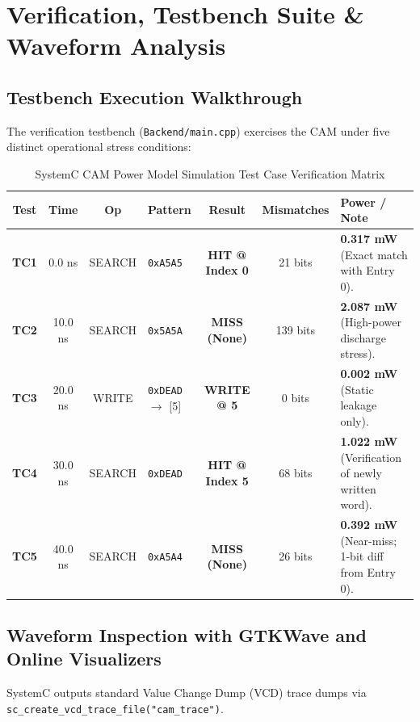 \documentclass[11pt,a4paper,oneside]{report}
\begin{document}
\chapter[Verification \& Waveforms]{Verification, Testbench Suite \& Waveform Analysis}

\section{Testbench Execution Walkthrough}
The verification testbench (\texttt{Backend/main.cpp}) exercises the CAM under five distinct operational stress conditions:

\begin{table}[h!]
\centering
\caption{SystemC CAM Power Model Simulation Test Case Verification Matrix}
\label{tab:test_matrix}
\begin{tabularx}{\textwidth}{ccclccX}
\toprule
\textbf{Test} & \textbf{Time} & \textbf{Op} & \textbf{Pattern} & \textbf{Result} & \textbf{Mismatches} & \textbf{Power / Note} \\
\midrule
\textbf{TC1} & 0.0 ns & SEARCH & \texttt{0xA5A5} & \textbf{HIT @ Index 0} & 21 bits & \textbf{0.317 mW} (Exact match with Entry 0). \\
\addlinespace
\textbf{TC2} & 10.0 ns & SEARCH & \texttt{0x5A5A} & \textbf{MISS (None)} & 139 bits & \textbf{2.087 mW} (High-power discharge stress). \\
\addlinespace
\textbf{TC3} & 20.0 ns & WRITE  & \texttt{0xDEAD} $\rightarrow$ [5] & \textbf{WRITE @ 5} & 0 bits & \textbf{0.002 mW} (Static leakage only). \\
\addlinespace
\textbf{TC4} & 30.0 ns & SEARCH & \texttt{0xDEAD} & \textbf{HIT @ Index 5} & 68 bits & \textbf{1.022 mW} (Verification of newly written word). \\
\addlinespace
\textbf{TC5} & 40.0 ns & SEARCH & \texttt{0xA5A4} & \textbf{MISS (None)} & 26 bits & \textbf{0.392 mW} (Near-miss; 1-bit diff from Entry 0). \\
\bottomrule
\end{tabularx}
\end{table}

\section{Waveform Inspection with GTKWave and Online Visualizers}
SystemC outputs standard Value Change Dump (VCD) trace dumps via \texttt{sc\_create\_vcd\_trace\_file("cam\_trace")}.
\end{document}
